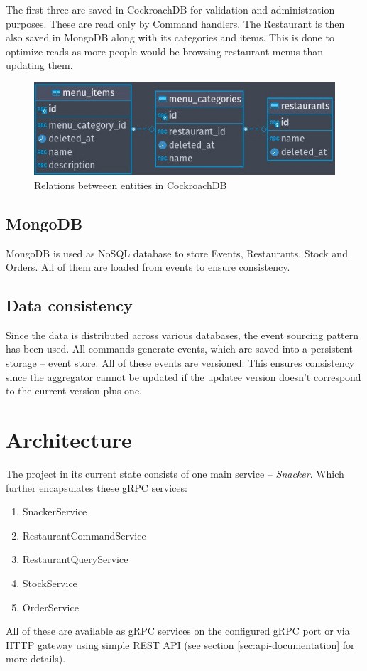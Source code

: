 \documentclass[11pt,a4paper]{article}
\begin{document}
	The first three are saved in CockroachDB for validation and administration purposes. These are read only by Command handlers. The Restaurant is then also saved in MongoDB along with its categories and items. This is done to optimize reads as more people would be browsing restaurant menus than updating them.
	
	\begin{figure}[h]
		\centering
		\includegraphics[width=0.7\linewidth]{img/er.jpg}
		\caption{Relations betweeen entities in CockroachDB}
		\label{fig:er}
	\end{figure}
	
	
	\subsection{MongoDB}
	MongoDB is used as NoSQL database to store Events, Restaurants, Stock and Orders. All of them are loaded from events to ensure consistency.
	
	\subsection{Data consistency}\label{sec:data-consistency}
		Since the data is distributed across various databases, the event sourcing pattern has been used. All commands generate events, which are saved into a persistent storage -- event store. All of these events are versioned. This ensures consistency since the aggregator cannot be updated if the updatee version doesn't correspond to the current version plus one.
	
\section{Architecture}
	The project in its current state consists of one main service -- \textit{Snacker}. Which further encapsulates these gRPC services:
	\begin{enumerate}
		\item SnackerService
		\item RestaurantCommandService
		\item RestaurantQueryService
		\item StockService
		\item OrderService
	\end{enumerate}
	All of these are available as gRPC services on the configured gRPC port or via HTTP gateway using simple REST API (see section \ref{sec:api-documentation} for more details).
	
\end{document}
